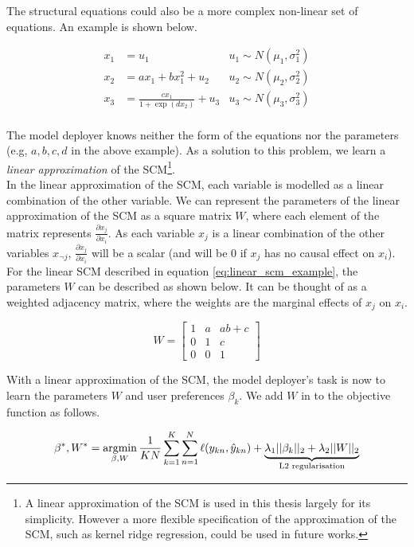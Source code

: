 The structural equations could also be a more complex non-linear set of equations. An example is shown below.

\begin{align}
	x_1 & = u_1 & u_1 \sim N(\mu_1,\sigma_1^2) \\ \nonumber
	x_2 & = ax_1 + bx_1^2 + u_2 & u_2 \sim N(\mu_2,\sigma_2^2) \\ \nonumber
	x_3 & = \frac{cx_1}{1 + \exp(dx_2)} + u_3 & u_3 \sim N(\mu_3,\sigma_3^2) \\ \nonumber
\end{align}

The model deployer knows neither the form of the equations nor the parameters (e.g, $a,b,c,d$ in the above example). As a solution to this problem, we learn a \textit{linear approximation} of the SCM\footnote{A linear approximation of the SCM is used in this thesis largely for its simplicity. However a more flexible specification of the approximation of the SCM, such as kernel ridge regression, could be used in future works.}.\\

In the linear approximation of the SCM, each variable is modelled as a linear combination of the other variable. We can represent the parameters of the linear approximation of the SCM as a square matrix $W$, where each element of the matrix represents $\frac{\partial x_j}{\partial x_i}$. As each variable $x_j$ is a linear combination of the other variables $x_{\neg j}$, $\frac{\partial x_j}{\partial x_i}$ will be a scalar (and will be 0 if $x_j$ has no causal effect on $x_i$). For the linear SCM described in equation \ref{eq:linear_scm_example}, the parameters $W$ can be described as shown below. It can be thought of as a weighted adjacency matrix, where the weights are the marginal effects of $x_j$ on $x_i$.

\begin{equation}
	W = 
	\begin{bmatrix}
		1 & a & ab+c \\
		0 & 1 & c \\
		0 & 0 & 1
	\end{bmatrix}
\end{equation}

With a linear approximation of the SCM, the model deployer's task is now to learn the parameters $W$ and user preferences $\beta_k$. We add $W$ in to the objective function as follows.

\begin{equation}
	\beta^*, W^* = \operatorname*{argmin}_{\beta, W} \frac{1}{KN} \sum_{k=1}^K \sum_{n=1}^N \ell (y_{kn}, \hat{y}_{kn}) + \underbrace{\lambda_1 ||\beta_k||_2 + \lambda_2||W||_2}_{\text{L2 regularisation}}
\end{equation}

